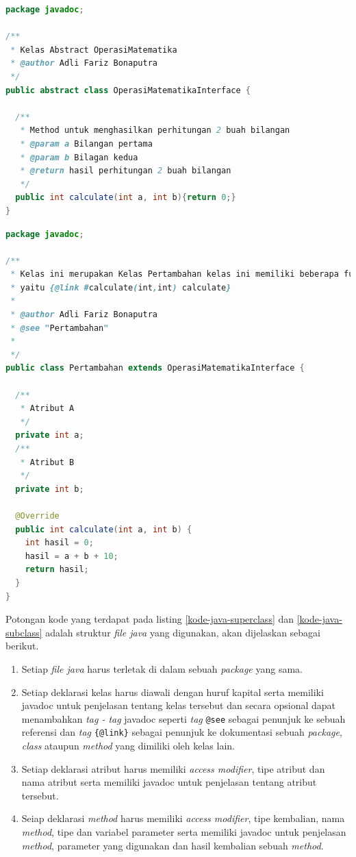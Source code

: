 \documentclass[a4paper,twoside]{article}
\begin{document}
\begin{enumerate}
\begin{enumerate}
\begin{lstlisting}[language=Java, caption=Contoh kode {\it java} dari {\it superclass} yang diuji, label={kode-java-superclass}]
package javadoc;

/**
 * Kelas Abstract OperasiMatematika
 * @author Adli Fariz Bonaputra
 */
public abstract class OperasiMatematikaInterface {
  
  /**
   * Method untuk menghasilkan perhitungan 2 buah bilangan
   * @param a Bilangan pertama
   * @param b Bilagan kedua
   * @return hasil perhitungan 2 buah bilangan
   */
  public int calculate(int a, int b){return 0;}
}
\end{lstlisting}

\begin{lstlisting}[language=Java, caption=Contoh kode {\it java} dari {\it subclass} yang diuji, label={kode-java-subclass}]
package javadoc;

/**
 * Kelas ini merupakan Kelas Pertambahan kelas ini memiliki beberapa fungsi
 * yaitu {@link #calculate(int,int) calculate}
 *
 * @author Adli Fariz Bonaputra
 * @see "Pertambahan"
 *
 */
public class Pertambahan extends OperasiMatematikaInterface {

  /**
   * Atribut A
   */
  private int a;
  /**
   * Atribut B
   */
  private int b;

  @Override
  public int calculate(int a, int b) {
    int hasil = 0;
    hasil = a + b + 10;
    return hasil;
  }
}
\end{lstlisting}

Potongan kode yang terdapat pada listing \ref{kode-java-superclass} dan \ref{kode-java-subclass} adalah struktur {\it file java} yang digunakan, akan dijelaskan sebagai berikut.

\begin{enumerate}
	\item Setiap {\it file java} harus terletak di dalam sebuah {\it package} yang sama.
	\item Setiap deklarasi kelas harus diawali dengan huruf kapital serta memiliki javadoc untuk penjelasan tentang kelas tersebut dan secara opsional dapat menambahkan {\it tag - tag} javadoc seperti {\it tag} \texttt{@see} sebagai penunjuk ke sebuah referensi dan {\it tag} \texttt{\{@link\}} sebagai penunjuk ke dokumentasi sebuah {\it package}, {\it class} ataupun {\it method} yang dimiliki oleh kelas lain.
	\item Setiap deklarasi atribut harus memiliki {\it access modifier}, tipe atribut dan nama atribut serta memiliki javadoc untuk penjelasan tentang atribut tersebut.
	\item Seiap deklarasi {\it method} harus memiliki {\it access modifier}, tipe kembalian, nama {\it method}, tipe dan variabel parameter serta memiliki javadoc untuk penjelasan {\it method}, parameter yang digunakan dan hasil kembalian sebuah {\it method}.
\end{enumerate}


\end{enumerate}
\end{enumerate}
\end{document}
